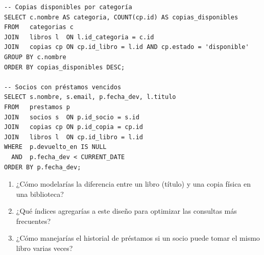 \begin{lstlisting}[caption={Consultas operacionales sobre el diseño}]
-- Copias disponibles por categoría
SELECT c.nombre AS categoria, COUNT(cp.id) AS copias_disponibles
FROM   categorias c
JOIN   libros l  ON l.id_categoria = c.id
JOIN   copias cp ON cp.id_libro = l.id AND cp.estado = 'disponible'
GROUP BY c.nombre
ORDER BY copias_disponibles DESC;

-- Socios con préstamos vencidos
SELECT s.nombre, s.email, p.fecha_dev, l.titulo
FROM   prestamos p
JOIN   socios s  ON p.id_socio = s.id
JOIN   copias cp ON p.id_copia = cp.id
JOIN   libros l  ON cp.id_libro = l.id
WHERE  p.devuelto_en IS NULL
  AND  p.fecha_dev < CURRENT_DATE
ORDER BY p.fecha_dev;
\end{lstlisting}

\begin{entrevistabox}
\begin{enumerate}
  \item ¿Cómo modelarías la diferencia entre un libro (título) y una copia física en una biblioteca?
  \item ¿Qué índices agregarías a este diseño para optimizar las consultas más frecuentes?
  \item ¿Cómo manejarías el historial de préstamos si un socio puede tomar el mismo libro varias veces?
\end{enumerate}
\end{entrevistabox}

